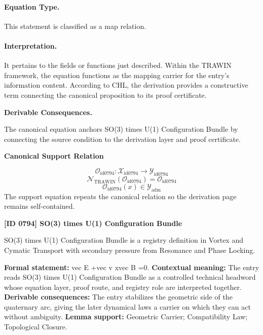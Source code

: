 \paragraph{Equation Type.}
This statement is classified as a map relation.

\paragraph{Interpretation.}
It pertains to the fields or functions just described. Within the TRAWIN framework, the equation functions as the mapping carrier for the entry’s information content. According to CHL, the derivation provides a constructive term connecting the canonical proposition to its proof certificate.

\par\vspace{0.35em}
\noindent\textbf{Derivable Consequences.}\quad
\begingroup
\footnotesize
\raggedright
The canonical equation anchors SO(3) times U(1) Configuration Bundle by connecting the source condition to the derivation layer and proof certificate.
\par\endgroup

\noindent\textbf{Canonical Support Relation}\par
\[
\mathcal{O}_{\mathrm{id0794}}:\mathcal{X}_{\mathrm{id0794}}\longrightarrow\mathcal{Y}_{\mathrm{id0794}}
\]
\[
\mathcal{N}_{\mathrm{TRAWIN}}(\mathcal{O}_{\mathrm{id0794}})=\mathcal{O}_{\mathrm{id0794}}
\]
\[
\mathcal{O}_{\mathrm{id0794}}(x)\in\mathcal{Y}_{\mathrm{adm}}
\]
\noindent The support equation repeats the canonical relation so the derivation page remains self-contained.\par

\clearpage
\noindent\textbf{[ID 0794] SO(3) times U(1) Configuration Bundle}\par
\vspace{0.35em}
\begingroup\small
{}
SO(3) times U(1) Configuration Bundle is a registry definition in Vortex and Cymatic Transport with secondary pressure from Resonance and Phase Locking.

\begingroup\footnotesize\setlength{\emergencystretch}{3em}\sloppy
\textbf{Formal statement:} vec E +vec v xvec B =0. \textbf{Contextual meaning:} The entry reads SO(3) times U(1) Configuration Bundle as a controlled technical headword whose equation layer, proof route, and registry role are interpreted together. \textbf{Derivable consequences:} The entry stabilizes the geometric side of the quaternary arc, giving the later dynamical laws a carrier on which they can act without ambiguity. \textbf{Lemma support:} Geometric Carrier; Compatibility Law; Topological Closure.\par
\endgroup

